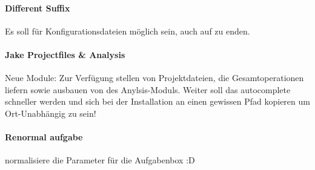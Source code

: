 \paragraph{Different Suffix}
Es soll für Konfigurationsdateien möglich sein, auch auf  zu enden.

\paragraph{Jake Projectfiles \& Analysis}
Neue \Jake[-]Module: Zur Verfügung stellen von Projektdateien, die Gesamtoperationen liefern sowie ausbauen von des Anylsis-Moduls. Weiter soll das autocomplete schneller werden und sich \Jake bei der Installation an einen gewissen Pfad kopieren um Ort-Unabhängig zu sein!

\paragraph{Renormal aufgabe}
normalisiere die Parameter für die Aufgabenbox :D